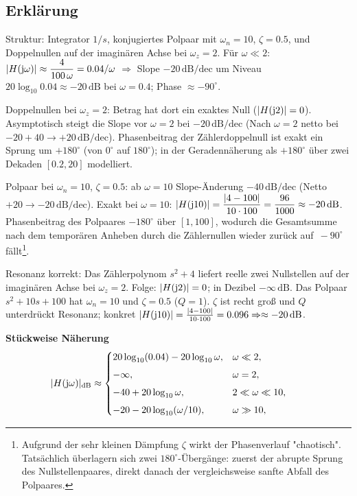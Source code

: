 \subsection{Erklärung}
\vspace{5mm}
\begin{description}[leftmargin=1.2em,labelsep=.6em,font=\bfseries]
\item[Schritt 1] Struktur: Integrator $1/s$, konjugiertes Polpaar mit $\omega_n=10$, $\zeta=0.5$, und Doppelnullen auf der imaginären Achse bei $\omega_z=2$. Für $\omega\ll2$: $|H(\operatorname{j}\!\omega)|\approx \dfrac{4}{100\,\omega}=0.04/\omega$ $\Rightarrow$ Slope $-20\,\mathrm{dB/dec}$ um Niveau $20\log_{10}0.04\approx-20\,\mathrm{dB}$ bei $\omega=0.4$; Phase $\approx-90^\circ$.
\item[Schritt 2] Doppelnullen bei $\omega_z=2$: Betrag hat dort ein exaktes Null ($|H(\operatorname{j}\!2)|=0$). Asymptotisch steigt die Slope vor $\omega=2$ bei $-20\,\mathrm{dB/dec}$ (Nach $\omega=2$ netto bei $-20+40\to+20\,\mathrm{dB/dec}$). Phasenbeitrag der Zählerdoppelnull ist exakt ein Sprung um $+180^\circ$ (von $0^\circ$ auf $180^\circ$); in der Geradennäherung als $+180^\circ$ über zwei Dekaden $[0.2,20]$ modelliert.
\item[Schritt 3] Polpaar bei $\omega_n=10$, $\zeta=0.5$: ab $\omega=10$ Slope-Änderung $-40\,\mathrm{dB/dec}$ (Netto $+20\to-20\,\mathrm{dB/dec}$). Exakt bei $\omega=10$: $|H(\operatorname{j}\!10)|=\dfrac{|4-100|}{10\cdot100}=\dfrac{96}{1000}\approx-20\,\mathrm{dB}$. Phasenbeitrag des Polpaares $-180^\circ$ über $[1,100]$, wodurch die Gesamtsumme nach dem temporären Anheben durch die Zählernullen wieder zurück auf $\,-90^\circ$ fällt\footnote{Aufgrund der sehr kleinen Dämpfung $\zeta$ wirkt der Phasenverlauf "chaotisch". Tatsächlich überlagern sich zwei $180^\circ$-Übergänge: zuerst der abrupte Sprung des Nullstellenpaares, direkt danach der vergleichsweise sanfte Abfall des Polpaares.}.
\item[Schritt 4] Resonanz korrekt: Das Zählerpolynom \(s^2+4\) liefert reelle zwei Nullstellen auf der imaginären Achse bei \(\omega_z=2\). Folge: \(|H(\operatorname{j}\!2)|=0\); in Dezibel $-\infty \,\mathrm{dB}$. Das Polpaar \(s^2+10s+100\) hat \(\omega_n=10\) und \(\zeta=0.5\) (\(Q=1\)). $\zeta$ ist recht groß und $Q$ unterdrückt Resonanz; konkret \(|H(\operatorname{j}\!10)|=\frac{|4-100|}{10\cdot100}=0.096\Rightarrow \approx -20\,\mathrm{dB}\).

\vspace{0.5cm}
\medskip
\noindent\textbf{Stückweise Näherung}
\[
|H(\operatorname{j}\!\omega)|_{\mathrm{dB}}\approx
\begin{cases}
20\log_{10}(0.04)-20\log_{10}\omega,& \omega\ll2,\\[4pt]
-\infty,& \omega=2,\\[4pt]
-40+20\log_{10}\omega,& 2\ll\omega\ll10,\\[4pt]
-20-20\log_{10}(\omega/10),& \omega\gg10,
\end{cases}
\qquad
\]
\end{description}
\newpage
